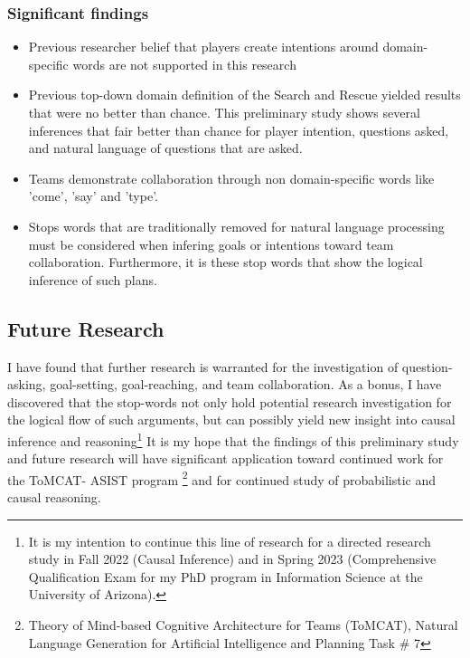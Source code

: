 \subsubsection{Significant findings}
\begin{itemize}
    \item Previous researcher belief that players create intentions around domain-specific words are not supported in this research
    \item Previous top-down domain definition of the Search and Rescue yielded results that were no better than chance. This preliminary study shows several inferences that fair better than chance for player intention, questions asked, and natural language of questions that are asked.
    \item Teams demonstrate collaboration through non domain-specific words like 'come', 'say' and 'type'.
    \item Stops words that are traditionally removed for natural language processing must be considered when infering goals or intentions toward team collaboration. Furthermore, it is these stop words that show the logical inference of such plans.
\end{itemize}


\subsection{Future Research}
I have found that further research is warranted for the investigation of question-asking, goal-setting, goal-reaching, and team collaboration. As a bonus, I have discovered that the stop-words not only hold potential research investigation for the logical flow of such arguments, but can possibly yield new insight into causal inference and reasoning\footnote{It is my intention to continue this line of research for a directed research study in Fall 2022 (Causal Inference) and in Spring 2023 (Comprehensive Qualification Exam for my PhD program in Information Science at the University of Arizona).} It is my hope that the findings of this preliminary study and future research will have significant application toward continued work for the ToMCAT- ASIST program \footnote{Theory of Mind-based Cognitive Architecture for Teams (ToMCAT), Natural Language Generation for Artificial Intelligence and Planning Task \# 7} and for continued study of probabilistic and causal reasoning. 

\newpage






